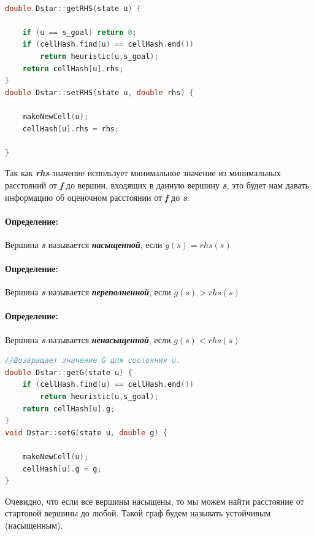 \documentclass[12pt]{article}
\begin{document}
\begin{lstlisting}[language=C,style=C]

double Dstar::getRHS(state u) {

    if (u == s_goal) return 0;
    if (cellHash.find(u) == cellHash.end())
        return heuristic(u,s_goal);
    return cellHash[u].rhs;
}
double Dstar::setRHS(state u, double rhs) {

    makeNewCell(u);
    cellHash[u].rhs = rhs;

}
\end{lstlisting}

Так как \textbf{\emph{rhs}}-значение использует минимальное значение из минимальных расстояний от \textbf{\emph{f}} до вершин, входящих в данную вершину \textbf{\emph{s}}, это будет нам давать информацию об оценочном расстоянии от \textbf{\emph{f}} до \textbf{\emph{s}}.
\paragraph{Определение:}
Вершина \textbf{\emph{s}} называется \textbf{\emph{насыщенной}}, если $g(s)=rhs(s)$
\paragraph{Определение:}
Вершина \textbf{\emph{s}} называется \textbf{\emph{переполненной}}, если $g(s)>rhs(s)$
\paragraph{Определение:}
Вершина \textbf{\emph{s}} называется \textbf{\emph{ненасыщенной}}, если $g(s)<rhs(s)$\\
\begin{lstlisting}[language=C,style=C]
//Возвращает значение G для состояния u.
double Dstar::getG(state u) {
    if (cellHash.find(u) == cellHash.end())
        return heuristic(u,s_goal);
    return cellHash[u].g;
}
void Dstar::setG(state u, double g) {

    makeNewCell(u);
    cellHash[u].g = g;
}
\end{lstlisting}
Очевидно, что если все вершины насыщены, то мы можем найти расстояние от стартовой вершины до любой. Такой граф будем называть устойчивым (насыщенным).
\end{document}
